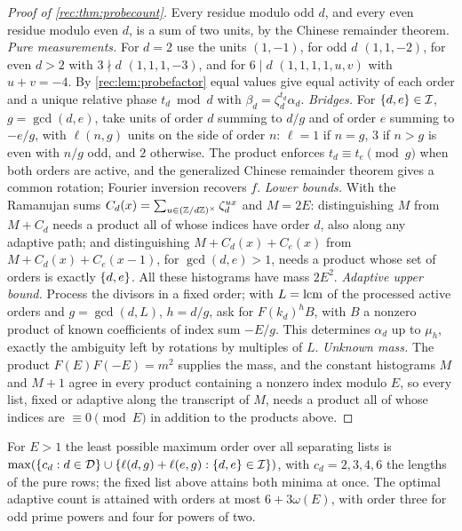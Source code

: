 \begin{proof}[Proof of \cref{rec:thm:probecount}]
Every residue modulo odd $d$, and every even residue modulo even $d$, is a sum of two units, by
the Chinese remainder theorem. \emph{Pure measurements.} For $d=2$ use the units $(1,-1)$, for odd $d$
$(1,1,-2)$, for even $d>2$ with $3\nmid d$ $(1,1,1,-3)$, and for $6\mid d$ $(1,1,1,1,u,v)$ with $u+v=-4$. By
\cref{rec:lem:probefactor} equal values give equal activity of each order and a unique relative phase
$t_d\bmod d$ with $\beta_d=\zeta_d^{t_d}\alpha_d$. \emph{Bridges.} For $\{d,e\}\in\mathcal I$, $g=\gcd(d,e)$, take units of order $d$
summing to $d/g$ and of order $e$ summing to $-e/g$, with $\ell(n,g)$ units on the side of order $n$:
$\ell=1$ if $n=g$, $3$ if $n>g$ is even with $n/g$ odd, and $2$ otherwise. The product enforces
$t_d\equiv t_e\pmod g$ when both orders are active, and the generalized Chinese remainder theorem gives
a common rotation; Fourier inversion recovers $f$. \emph{Lower bounds.} With the Ramanujan sums
$C_d(x)=\sum_{u\in(\mathbb{Z}/d\mathbb{Z})^\times}\zeta_d^{ux}$ and $M=2E$: distinguishing $M$ from $M+C_d$ needs a product all of
whose indices have order $d$, also along any adaptive path; and distinguishing $M+C_d(x)+C_e(x)$ from
$M+C_d(x)+C_e(x-1)$, for $\gcd(d,e)>1$, needs a product whose set of orders is exactly $\{d,e\}$. All
these histograms have mass $2E^2$. \emph{Adaptive upper bound.} Process the divisors in a fixed order;
with $L=\operatorname{lcm}$ of the processed active orders and $g=\gcd(d,L)$, $h=d/g$, ask for $F(k_d)^hB$, with $B$ a
nonzero product of known coefficients of index sum $-E/g$. This determines $\alpha_d$ up to $\mu_h$, exactly
the ambiguity left by rotations by multiples of $L$. \emph{Unknown mass.} The product $F(E)F(-E)=m^2$ supplies
the mass, and the constant histograms $M$ and $M+1$ agree in every product containing a nonzero index
modulo $E$, so every list, fixed or adaptive along the transcript of $M$, needs a product all of whose
indices are $\equiv0\pmod E$ in addition to the products above.
\end{proof}

\begin{theorem}\label{rec:thm:probedegree}
For $E>1$ the least possible maximum order over all separating lists is
$\max(\{c_d:d\in\mathcal D\}\cup\{\ell(d,g)+\ell(e,g):\{d,e\}\in\mathcal I\})$, with $c_d=2,3,4,6$ the lengths of the pure
rows; the fixed list above attains both minima at once. The optimal adaptive count is attained
with orders at most $6+3\omega(E)$, with order three for odd prime powers and four for powers of two.
\end{theorem}

